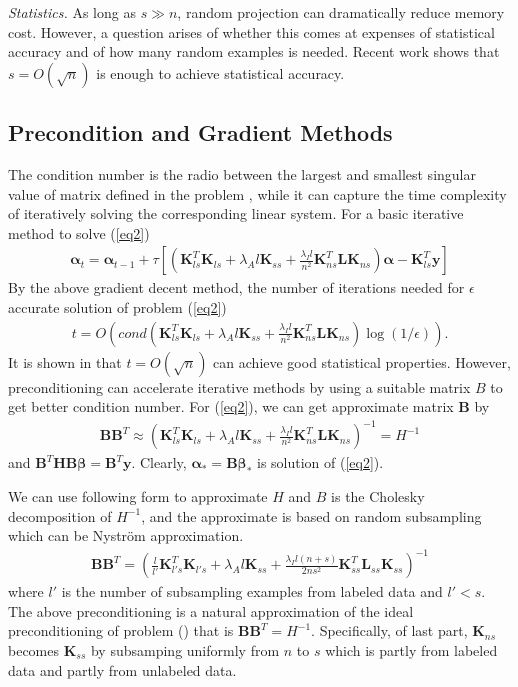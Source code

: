 \documentclass{article}
\begin{document}
\emph{Statistics.} As long as $s \gg n$, random projection can dramatically reduce memory cost.
However, a question arises of whether this comes at expenses of statistical accuracy
and of how many random examples is needed.
Recent work shows that $s=O(\sqrt{n})$ is enough to achieve statistical accuracy.
\subsection{Precondition and Gradient Methods}
The condition number is the radio between the largest and smallest singular value of matrix defined
in the problem \cite{saad2003iterative},
while it can capture the time complexity of iteratively solving the corresponding linear system.
For a basic iterative method to solve (\ref{eq2})
\begin{align}\label{basic_iter}
\boldsymbol{\alpha}_t=\boldsymbol{\alpha}_{t-1}
+\tau[(\mathbf{K}_{ls}^T\mathbf{K}_{ls}
+\lambda_A l \mathbf{K}_{ss}
+\frac{\lambda_I l}{n^2}\mathbf{K}_{ns}^T\mathbf{L}\mathbf{K}_{ns})
\boldsymbol{\alpha}-\mathbf{K}_{ls}^T\mathbf{y}]
\end{align}
By the above gradient decent method, the number of iterations needed for $\epsilon$ accurate solution of problem (\ref{eq2})
\begin{align*}
t=O(cond(\mathbf{K}_{ls}^T\mathbf{K}_{ls}
+\lambda_A l \mathbf{K}_{ss}
+\frac{\lambda_I l}{n^2}\mathbf{K}_{ns}^T\mathbf{L}\mathbf{K}_{ns})\log(1/\epsilon)).
\end{align*}
It is shown in \cite{camoriano2016nytro} that $t=O(\sqrt{n})$ can achieve good statistical properties.
However, preconditioning can accelerate iterative methods by using a suitable matrix $B$ to get better condition number. For (\ref{eq2}), we can get approximate matrix $\mathbf{B}$ by
\begin{align*}
\mathbf{B}\mathbf{B}^T \approx
(\mathbf{K}_{ls}^T\mathbf{K}_{ls}
+\lambda_A l \mathbf{K}_{ss}
+\frac{\lambda_I l}{n^2}\mathbf{K}_{ns}^T\mathbf{L}\mathbf{K}_{ns})^{-1}
=H^{-1}
\end{align*}
and $\mathbf{B}^T\mathbf{H}\mathbf{B}\boldsymbol{\beta}=\mathbf{B}^T\mathbf{y}$.
Clearly, $\boldsymbol{\alpha}_\ast=\mathbf{B}\boldsymbol{\beta}_\ast$ is solution of (\ref{eq2}).

We can use following form to approximate $H$ and $B$ is the Cholesky decomposition of $H^{-1}$,
and the approximate is based on random subsampling which can be Nystr\"om approximation.
\begin{align}\label{final_appr}
\boldsymbol{B}\boldsymbol{B}^T = 
(\frac{l}{l'}\mathbf{K}_{l's}^T\mathbf{K}_{l's}
+\lambda_A l \mathbf{K}_{ss}
+\frac{\lambda_I l(n+s)}{2ns^2}\mathbf{K}_{ss}^T\mathbf{L}_{ss}\mathbf{K}_{ss})^{-1}
\end{align}
where $l'$ is the number of subsampling examples from labeled data and $l' < s$.
The above preconditioning is a natural approximation of the ideal preconditioning of problem (\label{eq2}) that is 
$\boldsymbol{B}\boldsymbol{B}^T=H^{-1}$.
Specifically, of last part, $\mathbf{K}_{ns}$ becomes $\mathbf{K}_{ss}$ by subsamping uniformly from $n$ to $s$
which is partly from labeled data and partly from unlabeled data.
\end{document}
